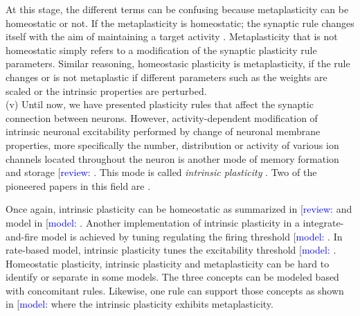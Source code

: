 At this stage, the different terms can be confusing because metaplasticity can be homeostatic or not. If the metaplasticity is homeostatic; the synaptic rule changes itself with the aim of maintaining a target activity \citep{karabanov_consensus_2015}. Metaplasticity that is not homeostatic simply refers to a modification of the synaptic plasticity rule parameters. Similar reasoning, homeostasic plasticity is metaplasticity, if the rule changes or is not metaplastic if different parameters such as the weights are scaled or the intrinsic properties are perturbed. \\

(v) Until now, we have presented plasticity rules that affect the synaptic connection between neurons. However, activity-dependent modification of intrinsic neuronal excitability performed by change of neuronal membrane properties, more specifically  the number, distribution or activity of various ion channels located throughout the neuron  is another mode of memory formation and storage [\textcolor{blue}{review:} \cite{debanne_plasticity_2019, caverzasio_brain_2018, daoudal_long-term_2003, zhang_other_2003, oleary_computational_2015}.  This mode is called \textit{intrinsic plasticity} \citep{titley_toward_2017}. Two of the pioneered papers in this field are \citep{lemasson_activity-dependent_1993, liu_model_1998}.


Once again, intrinsic plasticity can be homeostatic as summarized in [\textcolor{blue}{review:} \cite{williams_homeostatic_2013, turrigiano_hebb_2000} and model in [\textcolor{blue}{model:} \cite{honnuraiah_calcium-dependent_2013, oleary_cell_2014}. Another implementation of intrinsic plasticity in a integrate-and-fire model is achieved by tuning regulating the firing threshold [\textcolor{blue}{model:} \cite{wu_homeostatic_2020}. In rate-based model, intrinsic plasticity tunes the excitability threshold [\textcolor{blue}{model:} \cite{delamare_intrinsic_2022}.  Homeostatic plasticity, intrinsic plasticity and metaplasticity can be hard to identify or separate in some models. The three concepts can be modeled based with concomitant rules. Likewise, one rule can support those concepts as shown in 
[\textcolor{blue}{model:} \cite{sehgal_learning_2013} where the intrinsic plasticity exhibits metaplasticity. \\




